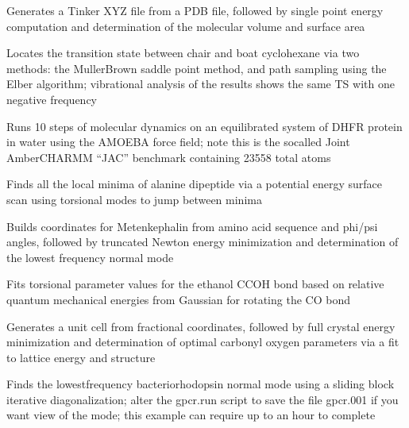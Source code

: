 \documentclass[letterpaper,11pt,english]{sphinxmanual}
\begin{document}
\sphinxAtStartPar
{}

\sphinxAtStartPar
Generates a Tinker XYZ file from a PDB file, followed by single point energy computation and determination of the molecular volume and surface area

\sphinxAtStartPar
{}

\sphinxAtStartPar
Locates the transition state between chair and boat cyclohexane via two methods: the Muller\sphinxhyphen{}Brown saddle point method, and path sampling using the Elber algorithm; vibrational analysis of the results shows the same TS with one negative frequency

\sphinxAtStartPar
{}

\sphinxAtStartPar
Runs 10 steps of molecular dynamics on an equilibrated system of DHFR protein in water using the AMOEBA force field; note this is the so\sphinxhyphen{}called Joint Amber\sphinxhyphen{}CHARMM “JAC” benchmark containing 23558 total atoms

\sphinxAtStartPar
{}

\sphinxAtStartPar
Finds all the local minima of alanine dipeptide via a potential energy surface scan using torsional modes to jump between minima

\sphinxAtStartPar
{}

\sphinxAtStartPar
Builds coordinates for Met\sphinxhyphen{}enkephalin from amino acid sequence and phi/psi angles, followed by truncated Newton energy minimization and determination of the lowest frequency normal mode

\sphinxAtStartPar
{}

\sphinxAtStartPar
Fits torsional parameter values for the ethanol C\sphinxhyphen{}C\sphinxhyphen{}O\sphinxhyphen{}H bond based on relative quantum mechanical energies from Gaussian for rotating the C\sphinxhyphen{}O bond

\sphinxAtStartPar
{}

\sphinxAtStartPar
Generates a unit cell from fractional coordinates, followed by full crystal energy minimization and determination of optimal carbonyl oxygen parameters via a fit to lattice energy and structure

\sphinxAtStartPar
{}

\sphinxAtStartPar
Finds the lowest\sphinxhyphen{}frequency bacteriorhodopsin normal mode using a sliding block iterative diagonalization; alter the gpcr.run script to save the file gpcr.001 if you want view of the mode; this example can require up to an hour to complete
\end{document}
